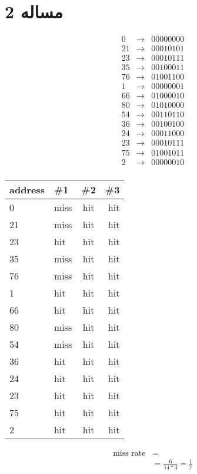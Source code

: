 \documentclass[11pt]{article}
\begin{document}
\section{مساله 2}
\begin{align*}
	0& \rightarrow &0000 0000 \\
	21& \rightarrow &0001 0101 \\
	23& \rightarrow &0001 0111 \\
	35& \rightarrow &0010 0011 \\
	76& \rightarrow &0100 1100 \\
	1& \rightarrow  &0000 0001 \\
	66& \rightarrow &0100 0010 \\
	80& \rightarrow &0101 0000 \\
	54& \rightarrow &0011 0110 \\
	36& \rightarrow &0010 0100 \\
	24& \rightarrow &0001 1000 \\
	23& \rightarrow &0001 0111 \\
	75& \rightarrow &0100 1011 \\
	2& \rightarrow &0000 0010 \\
\end{align*}
\begin{center}
	\begin{tabular}{l || l | c | r}
		address & \#1 & \#2 & \#3 \\
		\hline
		0  & miss & hit & hit \\
		21 & miss & hit & hit \\
		23 & hit  & hit & hit \\
		35 & miss & hit & hit \\
		76 & miss & hit & hit \\
		1  & hit  & hit & hit \\
		66 & hit  & hit & hit \\
		80 & miss & hit & hit \\
		54 & miss & hit & hit \\
		36 & hit  & hit & hit \\
		24 & hit  & hit & hit \\
		23 & hit  & hit & hit \\
		75 & hit  & hit & hit \\
		2  & hit  & hit & hit \\
	\end{tabular}
\end{center}
\begin{align*}
	\text{miss rate} &= \\
	&= \frac{6}{14 * 3} = \frac{1}{7} \\
\end{align*}
\end{document}
